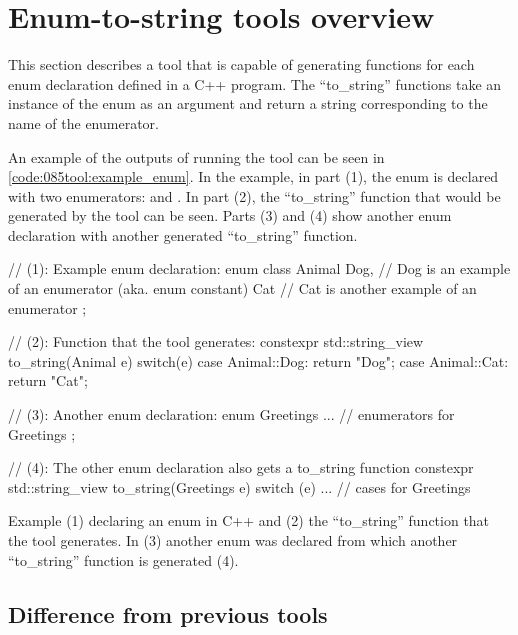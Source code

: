 \pagebreak
\section{Enum-to-string tools overview} \label{sec:085ex:040enum:en_overview}
This section describes a tool that is capable of generating  functions for each enum declaration defined in a C++ program. The ``to\_string'' functions take an instance of the enum as an argument and return a string corresponding to the name of the enumerator.

An example of the outputs of running the tool can be seen in \cref{code:085tool:example_enum}. In the example, in part (1), the enum  is declared with two enumerators:  and . In part (2), the ``to\_string'' function that would be generated by the tool can be seen. Parts (3) and (4) show another enum declaration with another generated ``to\_string'' function.

\begin{listing}[H]
    \begin{cppcode}
// (1): Example enum declaration:
enum class Animal{
    Dog, // Dog is an example of an enumerator (aka. enum constant)
    Cat // Cat is another example of an enumerator
};

// (2): Function that the tool generates:
constexpr std::string_view to_string(Animal e){
    switch(e) {
        case Animal::Dog: return "Dog";
        case Animal::Cat: return "Cat";
    }
}

// (3): Another enum declaration:
enum Greetings {
    ... // enumerators for Greetings
};

// (4): The other enum declaration also gets a to_string function
constexpr std::string_view to_string(Greetings e){
    switch (e) {
        ... // cases for Greetings
    }
}
    \end{cppcode}
    \caption{Example (1) declaring an enum in C++ and (2) the ``to\_string'' function that the tool generates. In (3) another enum was declared from which another ``to\_string'' function is generated (4).}
    \label{code:085tool:example_enum}
\end{listing}

\subsection{Difference from previous tools}

